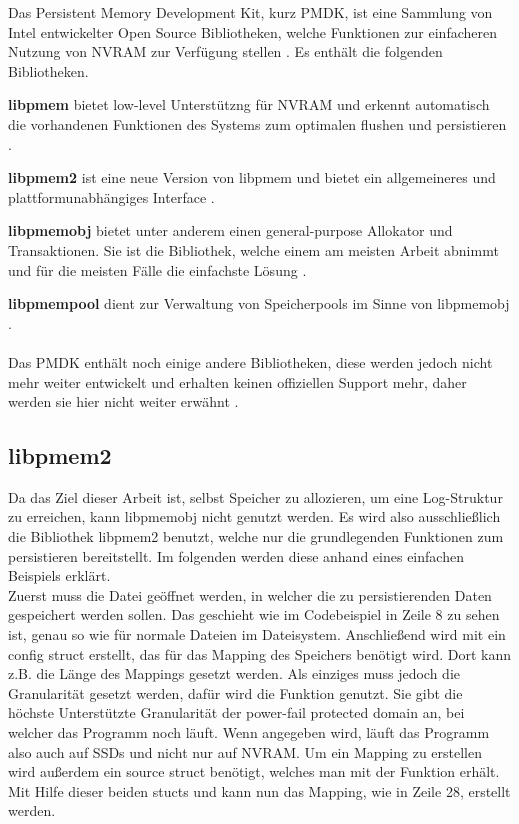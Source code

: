 \documentclass{class/thesis}
\begin{document}
\begin{thesis}
	Das Persistent Memory Development Kit, kurz PMDK, ist eine Sammlung von Intel entwickelter Open Source Bibliotheken, welche Funktionen zur einfacheren Nutzung von NVRAM zur Verfügung stellen \cite{Scargall:2020:PPM}.
	Es enthält die folgenden Bibliotheken.
	
	\textbf{libpmem} bietet low-level Unterstützng für NVRAM und erkennt automatisch die vorhandenen Funktionen des Systems zum optimalen flushen und persistieren \cite{Scargall:2020:PPM}.
	
	\textbf{libpmem2} ist eine neue Version von libpmem und bietet ein allgemeineres und plattformunabhängiges Interface \cite{PMDK:Docs}.

	\textbf{libpmemobj} bietet unter anderem einen general-purpose Allokator und Transaktionen. Sie ist die Bibliothek, welche einem am meisten Arbeit abnimmt und für die meisten Fälle die einfachste Lösung \cite{PMDK:Docs}\cite{Scargall:2020:PPM}.
	
	\textbf{libpmempool} dient zur Verwaltung von Speicherpools im Sinne von libpmemobj \cite{PMDK:Docs}.
	\\
	\\
	Das PMDK enthält noch einige andere Bibliotheken, diese werden jedoch nicht mehr weiter entwickelt und erhalten keinen offiziellen Support mehr, daher werden sie hier nicht weiter erwähnt \cite{PMDK:Docs}.	

	
	\subsection{libpmem2}
	
	Da das Ziel dieser Arbeit ist, selbst Speicher zu allozieren, um eine Log-Struktur zu erreichen, kann libpmemobj nicht genutzt werden. Es wird also ausschließlich die Bibliothek libpmem2 benutzt, welche nur die grundlegenden Funktionen zum persistieren bereitstellt. Im folgenden werden diese anhand eines einfachen Beispiels erklärt. \\
	Zuerst muss die Datei geöffnet werden, in welcher die zu persistierenden Daten gespeichert werden sollen. Das geschieht wie im Codebeispiel in Zeile 8 zu sehen ist, genau so wie für normale Dateien im Dateisystem.
	Anschließend wird mit  ein config struct erstellt, das für das Mapping des Speichers benötigt wird. Dort kann z.B. die Länge des Mappings gesetzt werden. Als einziges muss jedoch die Granularität gesetzt werden, dafür wird die Funktion  genutzt. Sie gibt die höchste Unterstützte Granularität der \glqq{}power-fail protected domain\grqq{} an, bei welcher das Programm noch läuft. Wenn  angegeben wird, läuft das Programm also auch auf SSDs und nicht nur auf NVRAM.
	Um ein Mapping zu erstellen wird außerdem ein source struct benötigt, welches man mit der Funktion  erhält. Mit Hilfe dieser beiden stucts und  kann nun das Mapping, wie in Zeile 28, erstellt werden.
	

\end{thesis}
\end{document}
